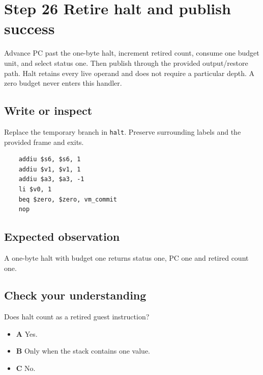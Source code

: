 \section{Step 26 Retire halt and publish success}\label{vm-s26}

Advance PC past the one-byte halt, increment retired count, consume one budget unit, and select status one. Then publish through the provided output/restore path. Halt retains every live operand and does not require a particular depth. A zero budget never enters this handler.

\subsection{Write or inspect}
Replace the temporary branch in \texttt{halt}. Preserve surrounding labels and the provided frame and exits.

\begin{verbatim}
    addiu $s6, $s6, 1
    addiu $v1, $v1, 1
    addiu $a3, $a3, -1
    li $v0, 1
    beq $zero, $zero, vm_commit
    nop
\end{verbatim}
\subsection{Expected observation}
A one-byte halt with budget one returns status one, PC one and retired count one.

\subsection{Check your understanding}
Does halt count as a retired guest instruction?

\begin{itemize}
  \item \textbf{A} Yes.
  \item \textbf{B} Only when the stack contains one value.
  \item \textbf{C} No.
\end{itemize}
